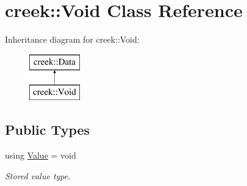 \hypertarget{classcreek_1_1_void}{}\section{creek\+:\+:Void Class Reference}
\label{classcreek_1_1_void}
Inheritance diagram for creek\+:\+:Void\+:\begin{figure}[H]
\begin{center}
\leavevmode
\includegraphics[height=2.000000cm]{classcreek_1_1_void}
\end{center}
\end{figure}
\subsection*{Public Types}
\begin{DoxyCompactItemize}
\item 
using \hyperlink{classcreek_1_1_void_a8a56a0e4936375b17ab9a3c6eb11e602}{Value} = void\hypertarget{classcreek_1_1_void_a8a56a0e4936375b17ab9a3c6eb11e602}{}\label{classcreek_1_1_void_a8a56a0e4936375b17ab9a3c6eb11e602}

\begin{DoxyCompactList}\small\item\em Stored value type. \end{DoxyCompactList}\end{DoxyCompactItemize}
